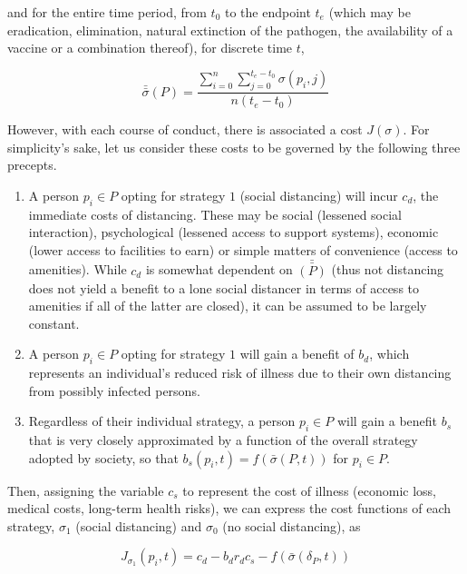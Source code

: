 \documentclass{article}
\begin{document}
\noindent and for the entire time period, from $t_0$ to the endpoint $t_e$ (which may be eradication, elimination, natural extinction of the pathogen, the availability of a vaccine or a combination thereof), for discrete time $t$,

\begin{equation}
	\bar{\bar{\sigma}}(P) = \frac{\displaystyle \sum_{i = 0}^n \displaystyle \sum_{j = 0}^{t_e - t_0} \sigma(p_i, j)}{n (t_e - t_0)}
	\label{eq:overall_strategy_over_time}
\end{equation}

However, with each course of conduct, there is associated a cost $J(\sigma)$. For simplicity's sake, let us consider these costs to be governed by the following three precepts.

\begin{enumerate}
	\item A person $p_i \in P$ opting for strategy $1$ (social distancing) will incur $c_d$, the immediate costs of distancing. These may be social (lessened social interaction), psychological (lessened access to support systems), economic (lower access to facilities to earn) or simple matters of convenience (access to amenities). While $c_d$ is somewhat dependent on $\bar{\bar{(P)}}$ (thus not distancing does not yield a benefit to a lone social distancer in terms of access to amenities if all of the latter are closed), it can be assumed to be largely constant.
	\item A person $p_i \in P$ opting for strategy $1$ will gain a benefit of $b_d$, which represents an individual's reduced risk of illness due to their own distancing from possibly infected persons.
	\item Regardless of their individual strategy, a person $p_i \in P$ will gain a benefit $b_s$ that is very closely approximated by a function of the overall strategy adopted by society, so that $b_s(p_i, t) = f(\bar{\sigma}(P, t))$ for $p_i \in P$.
\end{enumerate}

Then, assigning the variable $c_s$ to represent the cost of illness (economic loss, medical costs, long-term health risks), we can express the cost functions of each strategy, $\sigma_1$ (social distancing) and $\sigma_0$ (no social distancing), as

\begin{equation}
	J_{\sigma_1}(p_i, t) = c_d - b_d r_d c_s - f(\bar{\sigma}(\delta_P, t))
\end{equation}
\end{document}
